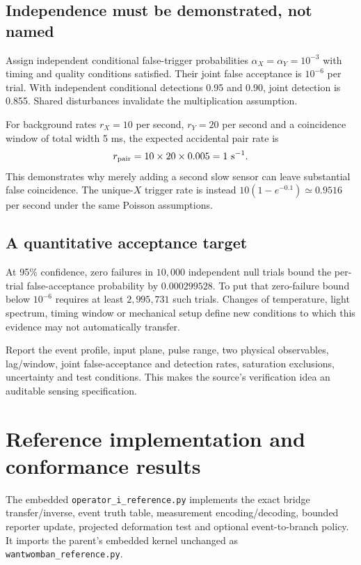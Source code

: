 \documentclass[10pt,a4paper]{article}
\numberwithin{equation}{section}
\newcommand{\newpart}{\clearpage}
\begin{document}
\subsection*{Independence must be demonstrated, not named}
Assign independent conditional false-trigger probabilities $\alpha_X=\alpha_Y=10^{-3}$ with timing and quality conditions satisfied. Their joint false acceptance is $10^{-6}$ per trial. With independent conditional detections 0.95 and 0.90, joint detection is 0.855. Shared disturbances invalidate the multiplication assumption.

For background rates $r_X=10$ per second, $r_Y=20$ per second and a coincidence window of total width 5 ms, the expected accidental pair rate is
\begin{equation}
r_{\rm pair}=10\times20\times0.005=1\ \mathrm{s}^{-1}.
\end{equation}
This demonstrates why merely adding a second slow sensor can leave substantial false coincidence. The unique-$X$ trigger rate is instead $10(1-e^{-0.1})\simeq0.9516$ per second under the same Poisson assumptions.

\subsection*{A quantitative acceptance target}
At 95\% confidence, zero failures in $10{,}000$ independent null trials bound the per-trial false-acceptance probability by $0.000299528$. To put that zero-failure bound below $10^{-6}$ requires at least $2{,}995{,}731$ such trials. Changes of temperature, light spectrum, timing window or mechanical setup define new conditions to which this evidence may not automatically transfer.

\begin{keybox}
Report the event profile, input plane, pulse range, two physical observables, lag/window, joint false-acceptance and detection rates, saturation exclusions, uncertainty and test conditions. This makes the source's verification idea an auditable sensing specification.
\end{keybox}

\newpart
\section{Reference implementation and conformance results}
\label{sec:software}
The embedded \texttt{operator\_i\_reference.py} implements the exact bridge transfer/inverse, event truth table, measurement encoding/decoding, bounded reporter update, projected deformation test and optional event-to-branch policy. It imports the parent's embedded kernel unchanged as \texttt{wantwomban\_reference.py}.
\end{document}
